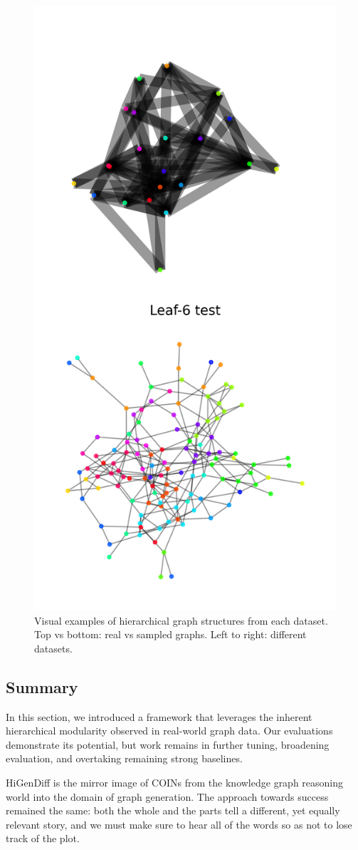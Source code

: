\begin{figure}[ht!]
        \hfill
    \includegraphics[width=0.15\linewidth]{figures/higendiff/lfr_gen.png}
    \caption[Visual examples of hierarchical graph structures from each HiGeDiff dataset.]{Visual examples of hierarchical graph structures from each dataset. Top vs bottom: real vs sampled graphs. Left to right: different datasets.}
    \label{fig:higendiff_examples}
\end{figure}

\subsection{Summary}

In this section, we introduced a framework that leverages the inherent hierarchical modularity observed in real-world graph data. Our evaluations demonstrate its potential, but work remains in further tuning, broadening evaluation, and overtaking remaining strong baselines.

HiGenDiff is the mirror image of COINs from the knowledge graph reasoning world into the domain of graph generation. The approach towards success remained the same: both the whole and the parts tell a different, yet equally relevant story, and we must make sure to hear all of the words so as not to lose track of the plot.
